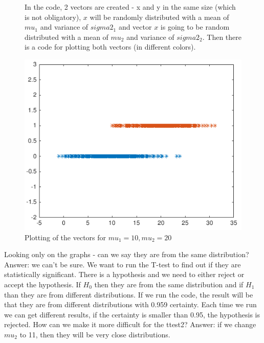 \begin{figure}[!ht]
    \centering
    \caption{In the code, 2 vectors are created - x and y in the same size (which is not obligatory), $x$ will be randomly distributed with a mean of \(mu_{1}\) and variance of \(sigma2_1\) and vector $x$ is going to be random distributed with a mean of \(mu_2\) and variance of \(sigma2_2\). Then there is a code for plotting both vectors (in different colors).} \label{fig:defmat4}
\end{figure}

\begin{figure}[!ht]
    \centering
    \includegraphics[scale=0.6]{images/defmatplot.png}
    \caption{Plotting of the vectors for \(mu_1 = 10, mu_2 = 20\)} \label{fig:defmatplot}
\end{figure}

Looking only on the graphs - can we say they are from the same distribution?
Answer: we can't be sure. We want to run the T-test to find out if they are
statistically significant. There is a hypothesis and we need to either reject or
accept the hypothesis. If \(H_0\) then they are from the same distribution and
if \(H_1\) than they are from different distributions. If we run the code, the
result will be that they are from different distributions with 0.959 certainty.
Each time we run we can get different results, if the certainty is smaller than
0.95, the hypothesis is rejected. How can we make it more difficult
for the ttest2? Answer: if we change \(mu_2\) to 11, then they will be very
close distributions. 

